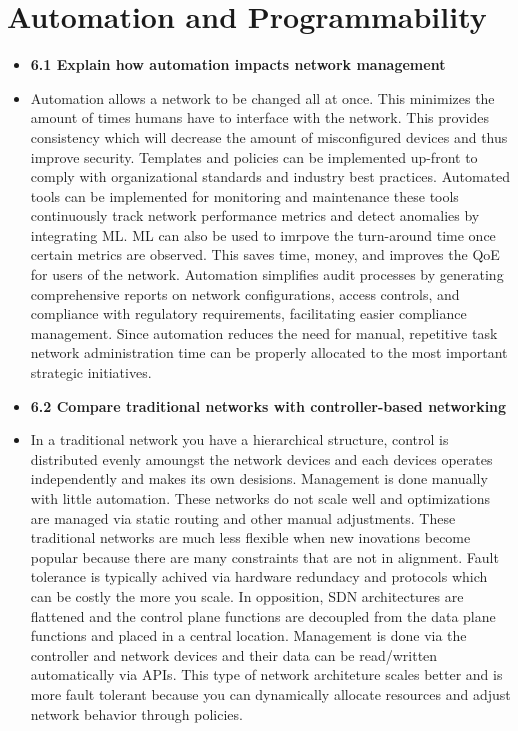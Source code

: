 \documentclass{article}
\begin{document}
\section{Automation and Programmability}
\begin{itemize}
  \item \textbf{6.1 Explain how automation impacts network management}
  	\item[] Automation allows a network to be changed all at once. This minimizes the amount of times humans have to interface with the network. This provides consistency which will decrease the amount of misconfigured devices and thus improve security. Templates and policies can be implemented up-front to comply with organizational standards and industry best practices. Automated tools can be implemented for monitoring and maintenance these tools continuously track network performance metrics and detect anomalies by integrating ML. ML can also be used to imrpove the turn-around time once certain metrics are observed. This saves time, money, and improves the QoE for users of the network. Automation simplifies audit processes by generating comprehensive reports on network configurations, access controls, and compliance with regulatory requirements, facilitating easier compliance management. Since automation reduces the need for manual, repetitive task network administration time can be properly allocated to the most important strategic initiatives.
  	  
  \item \textbf{6.2 Compare traditional networks with controller-based networking}
  	\item[] In a traditional network you have a hierarchical structure, control is distributed evenly amoungst the network devices and each devices operates independently and makes its own desisions. Management is done manually with little automation. These networks do not scale well and optimizations are managed via static routing and other manual adjustments. These traditional networks are much less flexible when new inovations become popular because there are many constraints that are not in alignment. Fault tolerance is typically achived via hardware redundacy and protocols which can be costly the more you scale. In opposition, SDN architectures are flattened and the control plane functions are decoupled from the data plane functions and placed in a central location. Management is done via the controller and network devices and their data can be read/written automatically via APIs. This type of network architeture scales better and is more fault tolerant because you can dynamically allocate resources and adjust network behavior through policies.  
  

\end{itemize}
\end{document}
